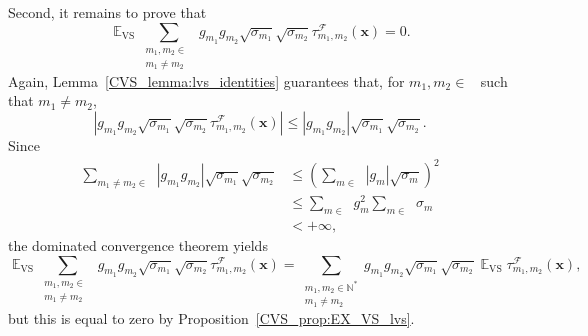 \documentclass[twoside,11pt]{book}
\numberwithin{theorem}{chapter}
\numberwithin{definition}{chapter}
\numberwithin{proposition}{chapter}
\numberwithin{corollary}{chapter}
\numberwithin{example}{chapter}
\numberwithin{lemma}{chapter}
\numberwithin{assumption}{chapter}
\DeclareMathOperator{\VS}{\mathrm{VS}}
\DeclareMathOperator{\EX}{\mathbb{E}}
\DeclareMathOperator{\F}{\mathcal{F}}
\DeclareMathOperator{\Ns}{\mathbb{N}^{*}}
\begin{document}
Second, it remains to prove that
\begin{equation}\label{CVS_eq:interchange_EX_VS_cross_lvs}
\EX_{\VS} \sum\limits_{\substack{m_{1},m_{2} \in \Ns \\ m_{1} \neq m_{2}}}  g_{m_{1}}g_{m_{2}} \sqrt{\sigma_{m_{1}}} \sqrt{\sigma_{m_{2}}} \tau_{m_{1},m_{2}}^{\F}(\bm{x})
= 0.
\end{equation}
Again, Lemma~\ref{CVS_lemma:lvs_identities} guarantees that, for $m_{1},m_{2} \in \Ns$ such that $m_{1} \neq m_{2}$,
\begin{equation}
| g_{m_{1}}g_{m_{2}} \sqrt{\sigma_{m_{1}}} \sqrt{\sigma_{m_{2}}} \tau_{m_{1},m_{2}}^{\F}(\bm{x})| \leq | g_{m_{1}}g_{m_{2}} | \sqrt{\sigma_{m_{1}}} \sqrt{\sigma_{m_{2}}}.
\end{equation}
Since
\begin{align}
\sum\limits_{m_{1} \neq m_{2} \in \Ns} |g_{m_{1}}g_{m_{2}}| \sqrt{\sigma_{m_{1}}} \sqrt{\sigma_{m_{2}}}
& \leq  \left(\sum\limits_{m \in \Ns} |g_{m}| \sqrt{\sigma_{m}} \right)^{2} \nonumber \\
& \leq \sum\limits_{m \in \Ns}g_{m}^{2} \sum\limits_{m \in \Ns} \sigma_{m} \nonumber \\
& < + \infty,
\end{align}
the dominated convergence theorem yields 
$$
\EX_{\VS} \sum\limits_{\substack{m_{1},m_{2} \in \Ns \\ m_{1} \neq m_{2}}}  g_{m_{1}}g_{m_{2}} \sqrt{\sigma_{m_{1}}} \sqrt{\sigma_{m_{2}}} \tau_{m_{1},m_{2}}^{\F}(\bm{x})
= \sum\limits_{\substack{m_{1},m_{2} \in \mathbb{N}^{*} \\ m_{1} \neq m_{2}}}  g_{m_{1}}g_{m_{2}} \sqrt{\sigma_{m_{1}}} \sqrt{\sigma_{m_{2}}} \EX_{\VS} \tau_{m_{1},m_{2}}^{\F}(\bm{x}),
$$
but this is equal to zero by Proposition~\ref{CVS_prop:EX_VS_lvs}.
\end{document}
